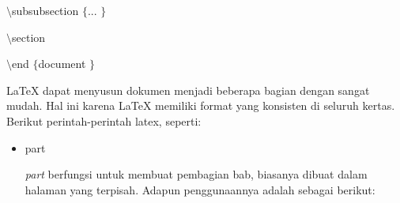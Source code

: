 {\fontsize{10pt}{10pt}\selectfont  $  \setminus  $subsubsection $  \{  $... $  \}  $}
 \par
\vspace{10pt}
{\fontsize{10pt}{10pt}\selectfont  $  \setminus  $section}
 \par
\vspace{10pt}
{\fontsize{10pt}{10pt}\selectfont  $  \setminus  $end $  \{  $document $  \}  $}
 \par
\vspace{12pt}
\hspace{0.50in} LaTeX dapat menyusun dokumen menjadi beberapa bagian dengan sangat mudah. Hal ini karena LaTeX memiliki format yang konsisten di seluruh kertas. Berikut perintah-perintah latex, seperti:
 \begin{itemize}
\item part \par
\textit{part} berfungsi untuk membuat pembagian bab, biasanya dibuat dalam halaman yang terpisah. Adapun penggunaannya adalah sebagai berikut:


\end{itemize}
